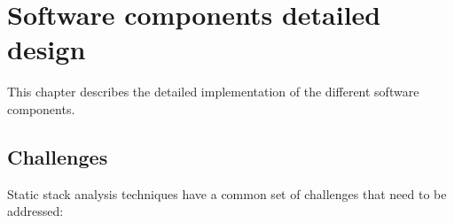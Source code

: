 \chapter{Software components detailed design}
\label{ch:detailed}

This chapter describes the detailed implementation of the different
software components.

\section{Challenges}
\label{sc:challenges}

Static stack analysis techniques have a common set of challenges that
need to be addressed:

